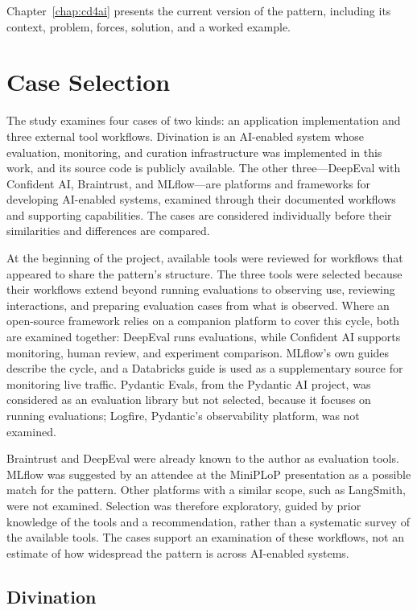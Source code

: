 Chapter~\ref{chap:cd4ai} presents the current version of the pattern,
including its context, problem, forces, solution, and a worked example.

\section{Case Selection}
\label{sec:method-cases}

The study examines four cases of two kinds: an application implementation and
three external tool workflows. Divination is an AI-enabled system whose
evaluation, monitoring, and curation infrastructure was implemented in this
work, and its source code is publicly available. The other three---DeepEval
with Confident AI, Braintrust, and MLflow---are platforms and frameworks for
developing AI-enabled systems, examined through their documented workflows and
supporting capabilities. The cases are considered individually before their
similarities and differences are compared.

At the beginning of the project, available tools were reviewed for workflows
that appeared to share the pattern's structure. The three tools were selected
because their workflows extend beyond running evaluations to observing use,
reviewing interactions, and preparing evaluation cases from what is observed.
Where an open-source framework relies on a companion platform to cover this
cycle, both are examined together: DeepEval runs evaluations, while Confident
AI supports monitoring, human review, and experiment comparison. MLflow's own
guides describe the cycle, and a Databricks guide is used as a supplementary
source for monitoring live traffic. Pydantic Evals, from the Pydantic AI
project, was considered as an evaluation library but not selected, because it
focuses on running evaluations; Logfire, Pydantic's observability platform, was
not examined.

Braintrust and DeepEval were already known to the author as evaluation tools.
MLflow was suggested by an attendee at the MiniPLoP presentation as a possible
match for the pattern. Other platforms with a similar scope, such as
LangSmith, were not examined. Selection was therefore exploratory, guided by
prior knowledge of the tools and a recommendation, rather than a systematic
survey of the available tools. The cases support an examination of these
workflows, not an estimate of how widespread the pattern is across AI-enabled
systems.

\subsection{Divination}
\label{sec:method-divination}

